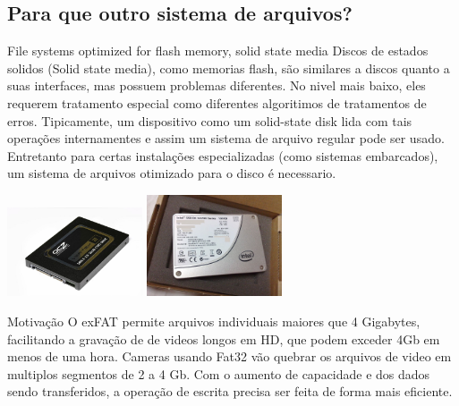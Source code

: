 \documentclass[11pt]{beamer}
\begin{document}
\subsection{Para que outro sistema de arquivos?}
\begin{frame}{File systems optimized for flash memory, solid state media}
Discos de estados solidos (Solid state media), como memorias flash, são similares a discos quanto a suas interfaces, mas possuem problemas diferentes. No nivel mais baixo, eles requerem tratamento especial como diferentes algoritimos de tratamentos de erros. Tipicamente, um dispositivo como um solid-state disk lida com tais operações internamentes e assim um sistema de arquivo regular pode ser usado. Entretanto para certas instalações especializadas (como sistemas embarcados), um sistema de arquivos otimizado para o disco é necessario.

\begin{center}
 \includegraphics[width=0.3\textwidth]{sata1.jpg}
  \includegraphics[width=0.3\textwidth]{sata2.jpg}
\end{center}

\end{frame}


\begin{frame}{Motivação}
O exFAT permite arquivos individuais maiores que 4 Gigabytes, facilitando a gravação de de videos longos em HD, que podem exceder 4Gb em menos de uma hora. Cameras usando Fat32 vão quebrar os arquivos de video em multiplos segmentos de 2 a 4 Gb. Com o aumento  de capacidade e dos dados sendo transferidos, a operação de escrita precisa ser feita de forma mais eficiente.
\end{frame}
\end{document}
